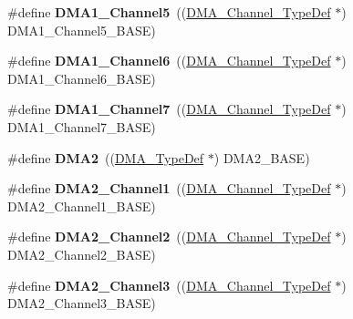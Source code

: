 \begin{DoxyCompactItemize}
\item 
\hypertarget{group___peripheral__declaration_ga06ff98ddef3c962795d2e2444004abff}{\#define {\bfseries D\-M\-A1\-\_\-\-Channel5}~((\hyperlink{struct_d_m_a___channel___type_def}{D\-M\-A\-\_\-\-Channel\-\_\-\-Type\-Def} $\ast$) D\-M\-A1\-\_\-\-Channel5\-\_\-\-B\-A\-S\-E)}\label{group___peripheral__declaration_ga06ff98ddef3c962795d2e2444004abff}

\item 
\hypertarget{group___peripheral__declaration_gac013c4376e4797831b5ddd2a09519df8}{\#define {\bfseries D\-M\-A1\-\_\-\-Channel6}~((\hyperlink{struct_d_m_a___channel___type_def}{D\-M\-A\-\_\-\-Channel\-\_\-\-Type\-Def} $\ast$) D\-M\-A1\-\_\-\-Channel6\-\_\-\-B\-A\-S\-E)}\label{group___peripheral__declaration_gac013c4376e4797831b5ddd2a09519df8}

\item 
\hypertarget{group___peripheral__declaration_ga4f9c23b3d1add93ed206b5c9afa5cda3}{\#define {\bfseries D\-M\-A1\-\_\-\-Channel7}~((\hyperlink{struct_d_m_a___channel___type_def}{D\-M\-A\-\_\-\-Channel\-\_\-\-Type\-Def} $\ast$) D\-M\-A1\-\_\-\-Channel7\-\_\-\-B\-A\-S\-E)}\label{group___peripheral__declaration_ga4f9c23b3d1add93ed206b5c9afa5cda3}

\item 
\hypertarget{group___peripheral__declaration_ga506520140eec1708bc7570c49bdf972d}{\#define {\bfseries D\-M\-A2}~((\hyperlink{struct_d_m_a___type_def}{D\-M\-A\-\_\-\-Type\-Def} $\ast$) D\-M\-A2\-\_\-\-B\-A\-S\-E)}\label{group___peripheral__declaration_ga506520140eec1708bc7570c49bdf972d}

\item 
\hypertarget{group___peripheral__declaration_gad86c75e1ff89e03e15570f47962865c8}{\#define {\bfseries D\-M\-A2\-\_\-\-Channel1}~((\hyperlink{struct_d_m_a___channel___type_def}{D\-M\-A\-\_\-\-Channel\-\_\-\-Type\-Def} $\ast$) D\-M\-A2\-\_\-\-Channel1\-\_\-\-B\-A\-S\-E)}\label{group___peripheral__declaration_gad86c75e1ff89e03e15570f47962865c8}

\item 
\hypertarget{group___peripheral__declaration_ga316024020799373b9d8e35c316c74f24}{\#define {\bfseries D\-M\-A2\-\_\-\-Channel2}~((\hyperlink{struct_d_m_a___channel___type_def}{D\-M\-A\-\_\-\-Channel\-\_\-\-Type\-Def} $\ast$) D\-M\-A2\-\_\-\-Channel2\-\_\-\-B\-A\-S\-E)}\label{group___peripheral__declaration_ga316024020799373b9d8e35c316c74f24}

\item 
\hypertarget{group___peripheral__declaration_ga6dca52a79587e0ca9a5d669048b4c7eb}{\#define {\bfseries D\-M\-A2\-\_\-\-Channel3}~((\hyperlink{struct_d_m_a___channel___type_def}{D\-M\-A\-\_\-\-Channel\-\_\-\-Type\-Def} $\ast$) D\-M\-A2\-\_\-\-Channel3\-\_\-\-B\-A\-S\-E)}\label{group___peripheral__declaration_ga6dca52a79587e0ca9a5d669048b4c7eb}


\end{DoxyCompactItemize}
